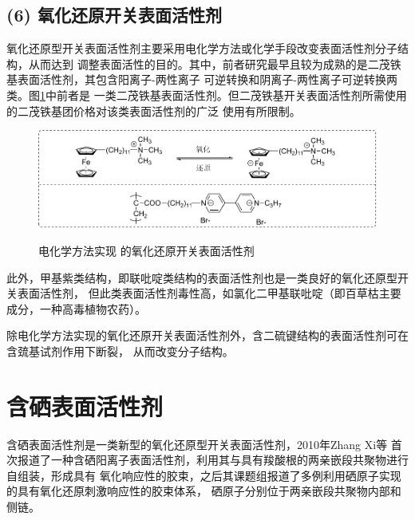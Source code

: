 \documentclass[bachelor,fandolfonts,replaceperiod]{jnuthesis}
\begin{document}
    \subsection*{(6) 氧化还原开关表面活性剂}
    氧化还原型开关表面活性剂主要采用电化学方法或化学手段改变表面活性剂分子结构，从而达到
    调整表面活性的目的。其中，前者研究最早且较为成熟的是二茂铁基表面活性剂，其包含阳离子-两性离子
    可逆转换和阴离子-两性离子可逆转换两类\cite{李云霞2011}。图\ref{fig:switchable-redox-cp2fe}中前者是
    一类二茂铁基表面活性剂。但二茂铁基开关表面活性剂所需使用的二茂铁基团价格对该类表面活性剂的广泛
    使用有所限制。
    \begin{figure}[htbp]
        \centering
        \includegraphics[width= \textwidth]{Figure/switchable-cp2fe.pdf}\\
        \caption{电化学方法实现 的氧化还原开关表面活性剂}\label{fig:switchable-redox-cp2fe}
    \end{figure}
    
    此外，甲基紫类结构，即联吡啶类结构的表面活性剂也是一类良好的氧化还原型开关表面活性剂，
    但此类表面活性剂毒性高，如氯化二甲基联吡啶（即百草枯主要成分，一种高毒植物农药）。
    
    除电化学方法实现的氧化还原开关表面活性剂外，含二硫键结构的表面活性剂可在含巯基试剂作用下断裂，
    从而改变分子结构。
    
%    
    
    
    \section{含硒表面活性剂}
    含硒表面活性剂是一类新型的氧化还原型开关表面活性剂，2010年Zhang Xi等\cite{zhangxi2010,zhangxi20102}
    首次报道了一种含硒阳离子表面活性剂，利用其与具有羧酸根的两亲嵌段共聚物进行自组装，形成具有
    氧化响应性的胶束，之后其课题组报道了多例利用硒原子实现的具有氧化还原刺激响应性的胶束体系，
    硒原子分别位于两亲嵌段共聚物内部和侧链。
    
\end{document}
